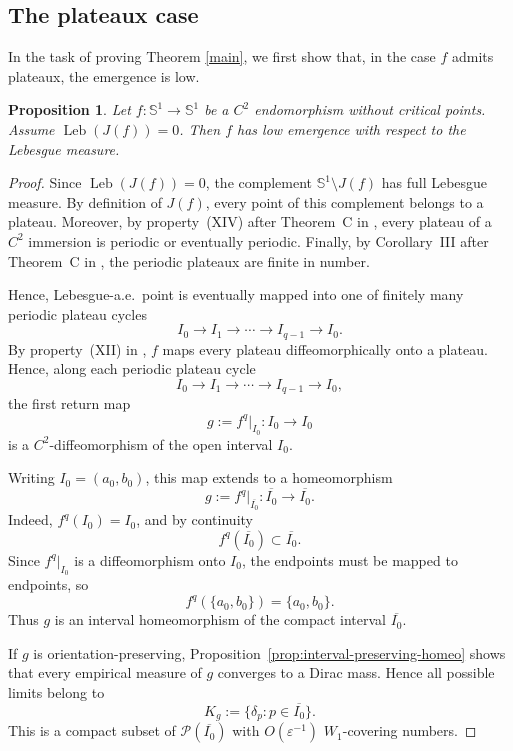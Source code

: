 \documentclass[12pt,a4paper,twoside]{article}
\theoremstyle{plain}
\newtheorem{proposition}[theorem]{Proposition}
\theoremstyle{definition}
\newcommand{\cP}{{\mathcal P}}
\newcommand{\Leb}{\operatorname{Leb}}
\newcommand{\Sone}{\mathbb{S}^1}
\begin{document}
\subsection{The plateaux case}
	In the task of proving Theorem \ref{main}, we first show that, in the case $f$ admits plateaux, the emergence is low.
	
	\begin{proposition}\label{prop:plateau}
		Let $f\colon \Sone\to \Sone$ be a $C^2$ endomorphism without critical points.
		Assume $\Leb(J(f))=0$.
		Then $f$ has low emergence with respect to the Lebesgue measure.
	\end{proposition}
	
	\begin{proof}
        Since $\Leb(J(f))=0$, the complement $\Sone\setminus J(f)$ has full Lebesgue measure. By definition of $J(f)$, every point of this complement belongs to a plateau. Moreover, by property~(XIV) after Theorem~C in \cite{mane}, every plateau of a $C^2$ immersion is periodic or eventually periodic. Finally, by Corollary~III after Theorem~C in \cite{mane}, the periodic plateaux are finite in number.
		
Hence, Lebesgue-a.e.\ point is eventually mapped into one of finitely many periodic plateau cycles
	\[
	I_0\to I_1\to \cdots \to I_{q-1}\to I_0.
	\]
By property~(XII) in \cite{mane}, \(f\) maps every plateau
diffeomorphically onto a plateau. Hence, along each periodic plateau cycle
\[
I_0\to I_1\to \cdots \to I_{q-1}\to I_0,
\]
the first return map
\[
g:=f^q|_{I_0}:I_0\to I_0
\]
is a \(C^2\)-diffeomorphism of the open interval \(I_0\).

Writing \(I_0=(a_0,b_0)\), this map extends to a homeomorphism
\[
g:=f^q|_{\overline{I_0}}:\overline{I_0}\to\overline{I_0}.
\]
Indeed, \(f^q(I_0)=I_0\), and by continuity
\[
f^q(\overline{I_0})\subset \overline{I_0}.
\]
Since \(f^q|_{I_0}\) is a diffeomorphism onto \(I_0\), the endpoints must
be mapped to endpoints, so
\[
f^q(\{a_0,b_0\})=\{a_0,b_0\}.
\]
Thus \(g\) is an interval homeomorphism of the compact interval
\(\overline{I_0}\).

If $g$ is orientation-preserving, Proposition~\ref{prop:interval-preserving-homeo} shows that every empirical measure
of $g$ converges to a Dirac mass. Hence all possible limits belong to
\[
K_g:=\{\delta_p:p\in\overline{I_0}\}.
\]
This is a compact subset of $\cP(\overline{I_0})$ with
$O(\varepsilon^{-1})$ $W_1$-covering numbers.


\end{proof}
\end{document}
